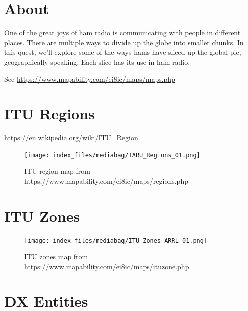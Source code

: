 \documentclass[
  letterpaper,
  DIV=11,
  numbers=noendperiod]{scrreport}
\begin{document}
\hypertarget{about-4}{%
\section*{About}\label{about-4}}


One of the great joys of ham radio is communicating with people in
different places. There are multiple ways to divide up the globe into
smaller chunks. In this quest, we'll explore some of the ways hams have
sliced up the global pie, geographically speaking. Each slice has its
use in ham radio.

See \url{https://www.mapability.com/ei8ic/maps/maps.php}

\hypertarget{itu-regions}{%
\section*{ITU Regions}\label{itu-regions}}


\url{https://en.wikipedia.org/wiki/ITU_Region}

\begin{figure}

{\centering \texttt{[image: index\_files/mediabag/IARU\_Regions\_01.png]}

}

\caption{ITU region map from
https://www.mapability.com/ei8ic/maps/regions.php}

\end{figure}

\hypertarget{itu-zones}{%
\section*{ITU Zones}\label{itu-zones}}


\begin{figure}

{\centering \texttt{[image: index\_files/mediabag/ITU\_Zones\_ARRL\_01.png]}

}

\caption{ITU zones map from
https://www.mapability.com/ei8ic/maps/ituzone.php}

\end{figure}

\hypertarget{dx-entities}{%
\section*{DX Entities}\label{dx-entities}}
\end{document}
